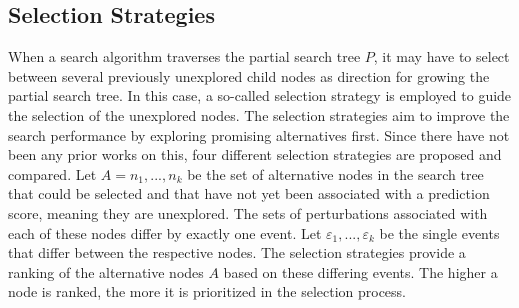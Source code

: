 \FloatBarrier
\subsection{Selection Strategies}
\label{s_Methodology_SelectionStrategies}

When a search algorithm traverses the partial search tree $P$, it may have to select between several previously unexplored child nodes as direction for growing the partial search tree. In this case, a so-called selection strategy is employed to guide the selection of the unexplored nodes. 
The selection strategies aim to improve the search performance by exploring promising alternatives first. Since there have not been any prior works on this, four different selection strategies are proposed and compared. Let $A = {n_1,...,n_k}$ be the set of alternative nodes in the search tree that could be selected and that have not yet been associated with a prediction score, meaning they are unexplored. The sets of perturbations associated with each of these nodes differ by exactly one event. Let $\varepsilon_1, ..., \varepsilon_k$ be the single events that differ between the respective nodes. The selection strategies provide a ranking of the alternative nodes $A$ based on these differing events. The higher a node is ranked, the more it is prioritized in the selection process.

